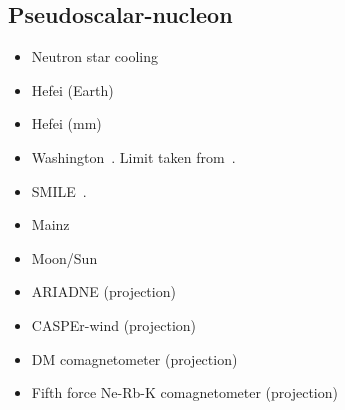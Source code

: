\documentclass[8pt,twocolumn]{extarticle}
\begin{document}
\begin{mdframed}
\subsection*{Pseudoscalar-nucleon}\vspace{-0.5em}
\begin{itemize}\setlength\itemsep{-0.5em}
	\item Neutron star cooling~\cite{Buschmann:2021juv}
	\item Hefei (Earth)~\cite{Zhang:2023qmu}
	\item Hefei (mm)~\cite{Feng:2022tsu}
    \item Washington~\cite{Venema:1992zz}. Limit taken from~\cite{Safronova:2017xyt}.
    \item SMILE~\cite{Lee:2018vaq}.
    \item Mainz~\cite{Tullney:2013wqa}
    \item Moon/Sun~\cite{Wu:2023vkx}
    \item ARIADNE (projection)~\cite{Arvanitaki:2014dfa}
    \item CASPEr-wind (projection)~\cite{JacksonKimball:2017elr}
    \item DM comagnetometer (projection)~\cite{Bloch:2019lcy}
    \item Fifth force Ne-Rb-K comagnetometer (projection)~\cite{Wei:2022ggs}
\end{itemize}
\end{mdframed}

\newpage
\end{document}
